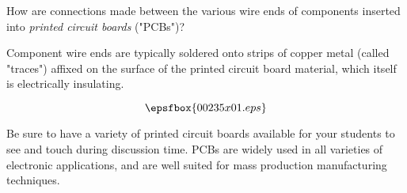 

How are connections made between the various wire ends of components inserted into {\it printed circuit boards} ("PCBs")?







Component wire ends are typically soldered onto strips of copper metal (called "traces") affixed on the surface of the printed circuit board material, which itself is electrically insulating.

$$\epsfbox{00235x01.eps}$$







Be sure to have a variety of printed circuit boards available for your students to see and touch during discussion time.  PCBs are widely used in all varieties of electronic applications, and are well suited for mass production manufacturing techniques.





